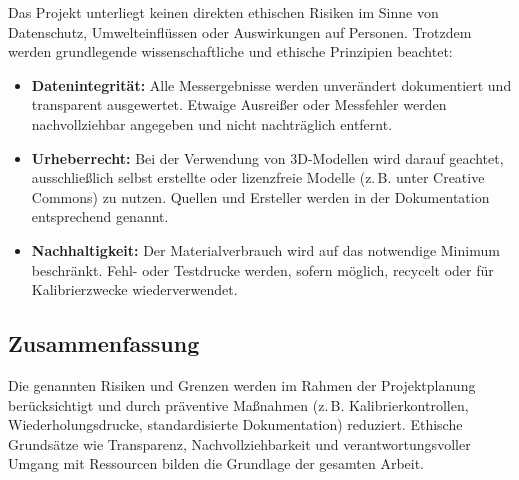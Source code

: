 Das Projekt unterliegt keinen direkten ethischen Risiken im Sinne von Datenschutz, Umwelteinflüssen oder Auswirkungen auf Personen.  
Trotzdem werden grundlegende wissenschaftliche und ethische Prinzipien beachtet:

\begin{itemize}
  \item \textbf{Datenintegrität:} 
  Alle Messergebnisse werden unverändert dokumentiert und transparent ausgewertet.  
  Etwaige Ausreißer oder Messfehler werden nachvollziehbar angegeben und nicht nachträglich entfernt.
  
  \item \textbf{Urheberrecht:} 
  Bei der Verwendung von 3D-Modellen wird darauf geachtet, ausschließlich selbst erstellte oder lizenzfreie Modelle (z.\,B. unter Creative Commons) zu nutzen.  
  Quellen und Ersteller werden in der Dokumentation entsprechend genannt.
  
  \item \textbf{Nachhaltigkeit:} 
  Der Materialverbrauch wird auf das notwendige Minimum beschränkt. Fehl- oder Testdrucke werden, sofern möglich, recycelt oder für Kalibrierzwecke wiederverwendet.
\end{itemize}

\subsection{Zusammenfassung}

Die genannten Risiken und Grenzen werden im Rahmen der Projektplanung berücksichtigt und durch präventive Maßnahmen (z.\,B. Kalibrierkontrollen, Wiederholungsdrucke, standardisierte Dokumentation) reduziert.  
Ethische Grundsätze wie Transparenz, Nachvollziehbarkeit und verantwortungsvoller Umgang mit Ressourcen bilden die Grundlage der gesamten Arbeit.
